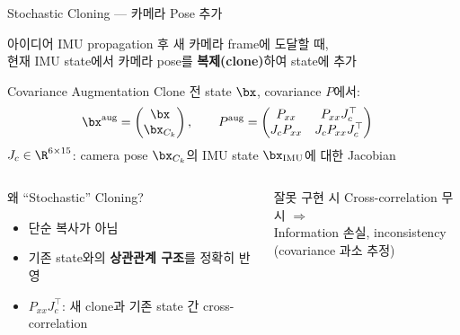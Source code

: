 \begin{frame}[shrink=10]{Stochastic Cloning — 카메라 Pose 추가}
  \begin{block}{아이디어}
    IMU propagation 후 새 카메라 frame에 도달할 때,\\
    현재 IMU state에서 카메라 pose를 \textbf{복제(clone)}하여 state에 추가
  \end{block}
  \begin{block}{Covariance Augmentation}
    Clone 전 state $\bx$, covariance $P$에서:
    \begin{align*}
      \bx^{\text{aug}} &= \begin{pmatrix}\bx \\ \bx_{C_k}\end{pmatrix},
      \qquad
      P^{\text{aug}} = \begin{pmatrix}
        P_{xx} & P_{xx} J_c^\top \\
        J_c P_{xx} & J_c P_{xx} J_c^\top
      \end{pmatrix}
    \end{align*}
    $J_c \in \R^{6\times 15}$: camera pose $\bx_{C_k}$의 IMU state $\bx_{\text{IMU}}$에 대한 Jacobian
  \end{block}
  \begin{columns}[T]
      \begin{exampleblock}{왜 ``Stochastic'' Cloning?}
        \begin{itemize}
          \item 단순 복사가 아님
          \item 기존 state와의 \textbf{상관관계 구조}를 정확히 반영
          \item $P_{xx}J_c^\top$: 새 clone과 기존 state 간 cross-correlation
        \end{itemize}
      \end{exampleblock}
      \begin{alertblock}{잘못 구현 시}
        Cross-correlation 무시 $\Rightarrow$\\
        Information 손실, inconsistency\\
        (covariance 과소 추정)
      \end{alertblock}
  \end{columns}
\end{frame}

